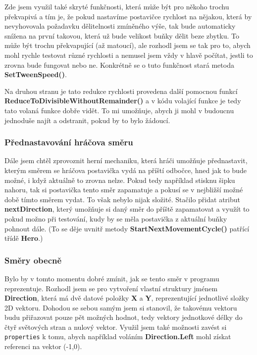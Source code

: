 \documentclass[a4]{article}
\begin{document}
Zde jsem využil také skryté funkčnosti, která může být pro někoho trochu překvapivá a tím je, že pokud nastavíme postavičce rychlost na nějakou, která by nevyhovovala požadavku dělitelnosti zmíněného výše, tak bude automaticky snížena na první takovou, která už bude velikost buňky dělit beze zbytku. To může být trochu překvapující (až matoucí), ale rozhodl jsem se tak pro to, abych mohl rychle testovat různé rychlosti a nemusel jsem vždy v hlavě počítat, jestli to zrovna bude fungovat nebo ne. Konkrétně se o tuto funkčnost stará metoda \textbf{SetTweenSpeed()}. 

Na druhou stranu je tato redukce rychlosti provedena další pomocnou funkcí \textbf{ReduceToDivisibleWithoutRemainder()} a v kódu volající funkce je tedy tato volaná funkce dobře vidět. To mi umožňuje, abych ji mohl v budoucnu jednoduše najít a odstranit, pokud by to bylo žádoucí.

\subsubsection{Přednastavování hráčova směru}
Dále jsem chtěl zprovoznit herní mechaniku, která hráči umožňuje přednastavit, kterým směrem se hráčova postavička vydá na příští odbočce, hned jak to bude možné, i když aktuálně to zrovna nelze. Pokud tedy například stisknu šipku nahoru, tak si postavička tento směr zapamatuje a pokusí se v nejbližší možné době tímto směrem vydat. To však nebylo nijak složité. Stačilo přidat atribut \textbf{nextDirection}, který umožňuje si daný směr do příště zapamatovat a využít to pokud možno při testování, kudy by se měla postavička z aktuální buňky pohnout dále. (To se děje uvnitř metody \textbf{StartNextMovementCycle()} patřící třídě \textbf{Hero}.)

\subsubsection{Směry obecně} \label{directions}
Bylo by v tomto momentu dobré zmínit, jak se tento směr v programu reprezentuje. Rozhodl jsem se pro vytvoření vlastní struktury jménem \textbf{Direction}, která má dvě datové položky \textbf{X} a \textbf{Y}, reprezentující jednotlivé složky 2D vektoru. Dohodou se sebou samým jsem si stanovil, že takovému vektoru budu přiřazovat pouze pět možných hodnot, tedy vektory jednotkové délky do čtyř světových stran a nulový vektor. Využil jsem také možnosti zavést si \verb|properties| k tomu, abych například voláním \textbf{Direction.Left} mohl získat referenci na vektor (-1,0).
\end{document}

